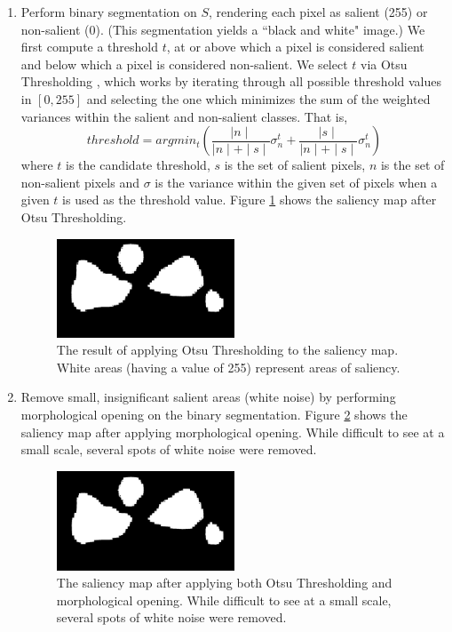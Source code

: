\begin{enumerate}
\item
Perform binary segmentation on $S$, rendering each pixel as salient (255) or non-salient (0). (This segmentation yields a ``black and white" image.) We first compute a threshold $t$, at or above which a pixel is considered salient and below which a pixel is considered non-salient. We select $t$ via Otsu Thresholding \cite{otsu1979threshold}, which works by iterating through all possible threshold values in $[0, 255]$ and selecting the one which minimizes the sum of the weighted variances within the salient and non-salient classes. That is,
\begin{equation}\label{eq:otsu}
    threshold=argmin_t(\frac{\mid n \mid}{\mid n \mid +\mid s \mid} \sigma_{n}^{t} + \frac{\mid s \mid}{\mid n \mid + \mid s \mid}\sigma_{n}^{t})
\end{equation}
where $t$ is the candidate threshold, $s$ is the set of salient pixels, $n$ is the set of non-salient pixels and $\sigma$ is the variance within the given set of pixels when a given $t$ is used as the threshold value. Figure \ref{fig:ws:thresh} shows the saliency map after Otsu Thresholding.

\begin{figure}[htbp]
  \centering
  \includegraphics[width=0.5\textwidth]{ws_images/ws_thresh.png}
  \caption{The result of applying Otsu Thresholding to the saliency map. White areas (having a value of 255) represent areas of saliency.}
  \label{fig:ws:thresh}
\end{figure}

\item
Remove small, insignificant salient areas (white noise) by performing morphological opening on the binary segmentation. Figure \ref{fig:ws:open} shows the saliency map after applying morphological opening. While difficult to see at a small scale, several spots of white noise were removed.

\begin{figure}[htbp]
  \centering
  \includegraphics[width=0.5\textwidth]{ws_images/ws_open.png}
  \caption{The saliency map after applying both Otsu Thresholding and morphological opening. While difficult to see at a small scale, several spots of white noise were removed.}
  \label{fig:ws:open}
\end{figure}


\end{enumerate}

